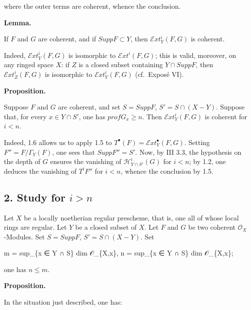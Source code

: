 \documentclass[
]{article}
\newenvironment{Shaded}{}{}
\newcommand{\NormalTok}[1]{#1}
\begin{document}
where the outer terms are coherent, whence the conclusion.

\textbf{Lemma.}

If \(F\) and \(G\) are coherent, and if \(Supp F \subset Y\), then
\(\mathcal{E}xt^{i}_{Y}(F, G)\) is coherent.

Indeed, \(\mathcal{E}xt^{i}_{Y}(F, G)\) is isomorphic to
\(\mathcal{E}xt^{i}(F, G)\); this is valid, moreover, on any ringed
space \(X\): if \(Z\) is a closed subset containing \(Y \cap Supp F\),
then \(\mathcal{E}xt^{i}_{Z}(F, G)\) is isomorphic to
\(\mathcal{E}xt^{i}_{Y}(F, G)\) (cf.~Exposé VI).

\textbf{Proposition.}

Suppose \(F\) and \(G\) are coherent, and set \(S = Supp F\),
\(S' = S \cap (X - Y)\). Suppose that, for every \(x \in Y \cap S'\),
one has \(prof G_{x} \geqslant n\). Then \(\mathcal{E}xt^{i}_{Y}(F, G)\)
is coherent for \(i < n\).

Indeed, 1.6 allows us to apply 1.5 to
\(T^{\bullet}(F) = \mathcal{E}xt^{\bullet}_{Y}(F, G)\). Setting
\(F'' = F/\Gamma_{Y}(F)\), one sees that \(Supp F'' = S'\). Now, by III
3.3, the hypothesis on the depth of \(G\) ensures the vanishing of
\(\mathcal{H}^{i}_{Y \cap S'}(G)\) for \(i < n\); by 1.2, one deduces
the vanishing of \(T^{i} F''\) for \(i < n\), whence the conclusion by
1.5.

\subsection{\texorpdfstring{2. Study for
\(i > n\)}{2. Study for i \textgreater{} n}}\label{study-for-i-n-1}

Let \(X\) be a locally noetherian regular prescheme, that is, one all of
whose local rings are regular. Let \(Y\) be a closed subset of \(X\).
Let \(F\) and \(G\) be two coherent \(\mathcal{O}_{X}\)-Modules. Set
\(S = Supp F\), \(S' = S \cap (X - Y)\). Set

\begin{Shaded}
\begin{Highlighting}[]
\NormalTok{m = sup\_\{x ∈ Y ∩ S\} dim 𝒪\_\{X,x\},}
\NormalTok{n = sup\_\{x ∈ Y ∩ S\textquotesingle{}\} dim 𝒪\_\{X,x\};}
\end{Highlighting}
\end{Shaded}

one has \(n \leqslant m\).

\textbf{Proposition.}

In the situation just described, one has:
\end{document}
